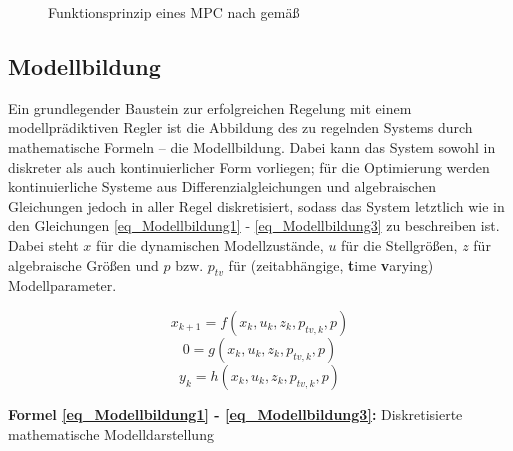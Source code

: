 \begin{figure}[h!]
    \centering
    \setlength{\fboxsep}{1pt}
    \setlength{\fboxrule}{1pt}
\caption[Funktionsprinzip eines MPC]{Funktionsprinzip eines MPC nach \cite[S. 3]{Schwenzer} gemäß} \cite{Richalet}
    \label{fig_MPCVerhalten}
\end{figure}

\subsection{Modellbildung} \label{subsec_Modellbildung}
Ein grundlegender Baustein zur erfolgreichen Regelung mit einem modellprädiktiven Regler ist die Abbildung des zu regelnden Systems durch mathematische Formeln – die Modellbildung.
Dabei kann das System sowohl in diskreter als auch kontinuierlicher Form vorliegen; für die Optimierung werden kontinuierliche Systeme aus Differenzialgleichungen und algebraischen Gleichungen jedoch in aller Regel diskretisiert, sodass das System letztlich wie in den Gleichungen \ref{eq_Modellbildung1} - \ref{eq_Modellbildung3} zu beschreiben ist.
Dabei steht $x$ für die dynamischen Modellzustände, $u$ für die Stellgrößen, $z$ für algebraische Größen und $p$ bzw.
$p_{tv}$ für (zeitabhängige, \textbf{t}ime \textbf{v}arying) Modellparameter. \cite[S. 3]{Schwenzer}\cite{Dompc1}

\begin{equation} \label{eq_Modellbildung1}
    x_{k+1} = f(x_k, u_k, z_k, p_{tv,k}, p)
\end{equation}
\vspace*{-2.5\baselineskip}
\begin{equation} \label{eq_Modellbildung2}
    0 = g(x_k, u_k, z_k, p_{tv,k}, p)
\end{equation}
\vspace*{-2.5\baselineskip}
\begin{equation} \label{eq_Modellbildung3}
    y_k = h(x_k, u_k, z_k, p_{tv,k}, p)
\end{equation}
\centerline{\small{\textsf{\textbf{Formel \ref{eq_Modellbildung1} - \ref{eq_Modellbildung3}:}} Diskretisierte mathematische Modelldarstellung}}


